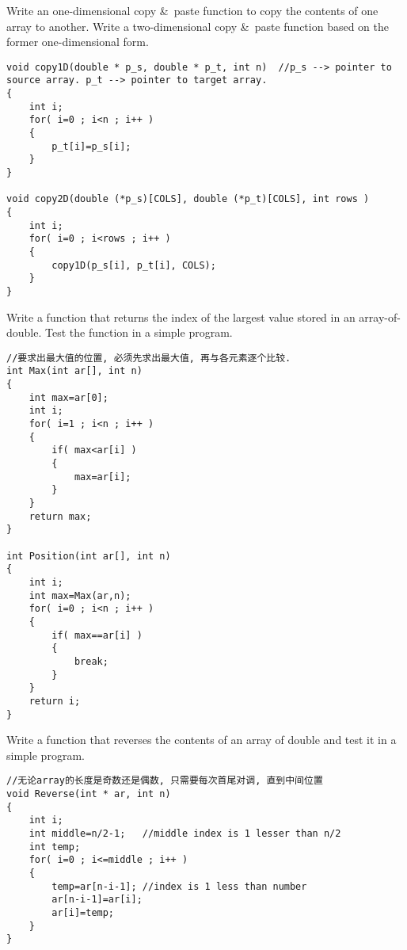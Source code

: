 \begin{question}
  Write an one-dimensional copy \&\ paste function to copy the contents of one array to another. Write a two-dimensional copy \&\ paste function based on the former one-dimensional form.
\end{question}
\begin{solution}
  \begin{verbatim}
void copy1D(double * p_s, double * p_t, int n)	//p_s --> pointer to source array. p_t --> pointer to target array.
{
	int i;
	for( i=0 ; i<n ; i++ )
	{
		p_t[i]=p_s[i];
	}
}

void copy2D(double (*p_s)[COLS], double (*p_t)[COLS], int rows )
{
	int i;
	for( i=0 ; i<rows ; i++ )
	{
		copy1D(p_s[i], p_t[i], COLS);
	}
}
  \end{verbatim}
\end{solution}

\begin{question}
Write a function that returns the index of the largest value stored in an array-of-double.
Test the function in a simple program.
\end{question}
\begin{solution}
  \begin{verbatim}
//要求出最大值的位置, 必须先求出最大值, 再与各元素逐个比较.
int Max(int ar[], int n)
{
	int max=ar[0];
	int i;
	for( i=1 ; i<n ; i++ )
	{
		if( max<ar[i] )
		{
			max=ar[i];
		}
	}
	return max;
}

int Position(int ar[], int n)
{
	int i;
	int max=Max(ar,n);
	for( i=0 ; i<n ; i++ )
	{
		if( max==ar[i] )
		{
			break;
		}
	}
	return i;
}
  \end{verbatim}
\end{solution}

\begin{question}
Write a function that reverses the contents of an array of double and test it in a simple
program.
\end{question}
\begin{solution}
  \begin{verbatim}
//无论array的长度是奇数还是偶数, 只需要每次首尾对调, 直到中间位置
void Reverse(int * ar, int n)
{
	int i;
	int middle=n/2-1;	//middle index is 1 lesser than n/2
	int temp;
	for( i=0 ; i<=middle ; i++ )
	{
		temp=ar[n-i-1];	//index is 1 less than number
		ar[n-i-1]=ar[i];
		ar[i]=temp;
	}
}
  \end{verbatim}
\end{solution}

